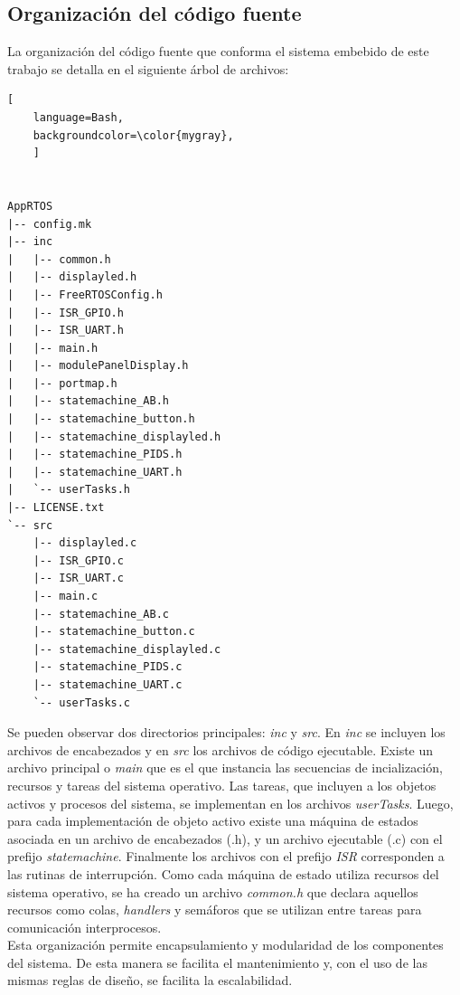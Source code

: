 \subsection{Organización del código fuente}
La organización del código fuente que conforma el sistema embebido de este trabajo se detalla en el siguiente árbol de archivos:

\begin{lstlisting}[
	language=Bash, 
	backgroundcolor=\color{mygray},
	]
	
	
AppRTOS
|-- config.mk
|-- inc
|   |-- common.h
|   |-- displayled.h
|   |-- FreeRTOSConfig.h
|   |-- ISR_GPIO.h
|   |-- ISR_UART.h
|   |-- main.h
|   |-- modulePanelDisplay.h
|   |-- portmap.h
|   |-- statemachine_AB.h
|   |-- statemachine_button.h
|   |-- statemachine_displayled.h
|   |-- statemachine_PIDS.h
|   |-- statemachine_UART.h
|   `-- userTasks.h
|-- LICENSE.txt
`-- src
    |-- displayled.c
    |-- ISR_GPIO.c
    |-- ISR_UART.c
    |-- main.c
    |-- statemachine_AB.c
    |-- statemachine_button.c
    |-- statemachine_displayled.c
    |-- statemachine_PIDS.c
    |-- statemachine_UART.c
    `-- userTasks.c
\end{lstlisting}

Se pueden observar dos directorios principales: \textit{inc} y \textit{src}. En \textit{inc} se incluyen los archivos de encabezados y en \textit{src} los archivos de código ejecutable. Existe un archivo principal o \textit{main} que es el que instancia las secuencias de incialización, recursos y tareas del sistema operativo. Las tareas, que incluyen a los objetos activos y procesos del sistema, se implementan en los archivos \textit{userTasks}. Luego, para cada implementación de objeto activo existe una máquina de estados asociada en un archivo de encabezados (.h),  y un archivo ejecutable (.c) con el prefijo \textit{statemachine}. Finalmente los archivos con el prefijo \textit{ISR} corresponden a las rutinas de interrupción. Como cada máquina de estado utiliza recursos del sistema operativo, se ha creado un archivo \textit{common.h} que declara aquellos recursos como colas, \textit{handlers} y semáforos que se utilizan entre tareas para comunicación interprocesos.\\

Esta organización permite encapsulamiento y modularidad de los componentes del sistema. De esta manera se facilita el mantenimiento y, con el uso de las mismas reglas de diseño, se facilita la escalabilidad.\\

